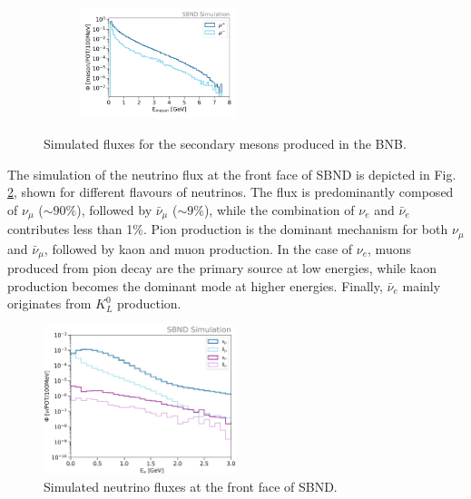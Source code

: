 \begin{figure}[hb!]
\begin{subfigure}{.5\linewidth}
\end{subfigure}\\[1ex]
\begin{subfigure}{\linewidth}
\centering
\includegraphics[width=0.5\textwidth]{BNB_Meson_Muon_Flux}
\end{subfigure}
\caption[Simulated Fluxes of Secondary Mesons]{
Simulated fluxes for the secondary mesons produced in the BNB. 
}
\label{fig:BNB_Meson_Flux}
\vspace{0.5cm}
\end{figure}

The simulation of the neutrino flux at the front face of SBND is depicted in Fig. \ref{fig:BNB_combined_neutrino_flux}, shown for different flavours of neutrinos. 
The flux is predominantly composed of $\nu_{\mu}$ ($\sim90\%$), followed by $\bar{\nu}_{\mu}$ ($\sim9\%$), while the combination of $\nu_{e}$ and $\bar{\nu}_{e}$ contributes less than 1\%.
Pion production is the dominant mechanism for both $\nu_{\mu}$ and $\bar{\nu}_{\mu}$, followed by kaon and muon production. 
In the case of $\nu_{e}$, muons produced from pion decay are the primary source at low energies, while kaon production becomes the dominant mode at higher energies. 
Finally, $\bar{\nu}_{e}$ mainly originates from $K^{0}_{L}$ production.

\begin{figure}[hb!] 
\centering    
\includegraphics[width=0.5\textwidth]{BNB_combined_neutrino_flux}
\caption[Simulated Neutrino Fluxes at the Front Face of SBND]{
Simulated neutrino fluxes at the front face of SBND. 
}
\label{fig:BNB_combined_neutrino_flux}
\end{figure}


